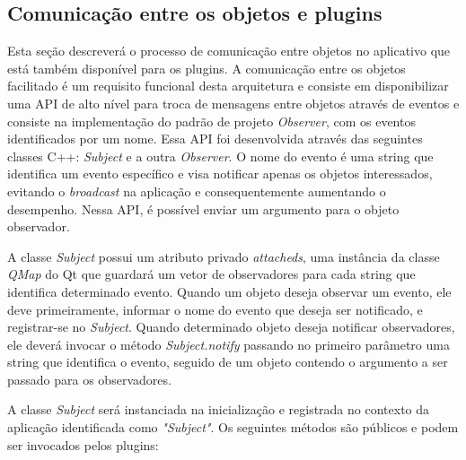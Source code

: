 \subsection{Comunicação entre os objetos e plugins}
Esta seção descreverá o processo de comunicação entre objetos no aplicativo que está também disponível para os plugins.
A comunicação entre os objetos facilitado é um requisito funcional desta arquitetura e consiste em disponibilizar uma API de alto nível para troca de mensagens entre objetos através de eventos e consiste na implementação do padrão de projeto \textit{Observer}, com os eventos identificados por um nome. Essa API foi desenvolvida através das seguintes classes C++: \textit{Subject} e a outra \textit{Observer}. O nome do evento é uma string que identifica um evento específico e visa notificar apenas os objetos interessados, evitando o \textit{broadcast} na aplicação e consequentemente aumentando o desempenho. Nessa API, é possível enviar um argumento para o objeto observador.\par

A classe \textit{Subject} possui um atributo privado \textit{attacheds}, uma instância da classe \textit{QMap} do Qt que guardará um vetor de observadores para cada string que identifica determinado evento. Quando um objeto deseja observar um evento, ele deve primeiramente, informar o nome do evento que deseja ser notificado, e registrar-se no \textit{Subject}. Quando determinado objeto deseja notificar observadores, ele deverá invocar o método \textit{Subject.notify} passando no primeiro parâmetro uma string que identifica o evento, seguido de um objeto contendo o argumento a ser passado para os observadores.

A classe \textit{Subject} será instanciada na inicialização e registrada no contexto da aplicação identificada como \textit{"Subject"}. Os seguintes métodos são públicos e podem ser invocados pelos plugins:

